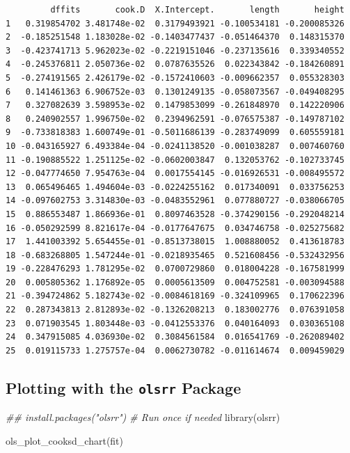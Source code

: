 \documentclass[
  letterpaper,
]{scrbook}
\newenvironment{Shaded}{\begin{snugshade}}{\end{snugshade}}
\newcommand{\DocumentationTok}[1]{\textcolor[rgb]{0.37,0.37,0.37}{\textit{#1}}}
\newcommand{\FunctionTok}[1]{\textcolor[rgb]{0.28,0.35,0.67}{#1}}
\newcommand{\NormalTok}[1]{\textcolor[rgb]{0.00,0.23,0.31}{#1}}
\begin{document}
\begin{verbatim}
         dffits       cook.D  X.Intercept.       length       height
1   0.319854702 3.481748e-02  0.3179493921 -0.100534181 -0.200085326
2  -0.185251548 1.183028e-02 -0.1403477437 -0.051464370  0.148315370
3  -0.423741713 5.962023e-02 -0.2219151046 -0.237135616  0.339340552
4  -0.245376811 2.050736e-02  0.0787635526  0.022343842 -0.184260891
5  -0.274191565 2.426179e-02 -0.1572410603 -0.009662357  0.055328303
6   0.141461363 6.906752e-03  0.1301249135 -0.058073567 -0.049408295
7   0.327082639 3.598953e-02  0.1479853099 -0.261848970  0.142220906
8   0.240902557 1.996750e-02  0.2394962591 -0.076575387 -0.149787102
9  -0.733818383 1.600749e-01 -0.5011686139 -0.283749099  0.605559181
10 -0.043165927 6.493384e-04 -0.0241138520 -0.001038287  0.007460760
11 -0.190885522 1.251125e-02 -0.0602003847  0.132053762 -0.102733745
12 -0.047774650 7.954763e-04  0.0017554145 -0.016926531 -0.008495572
13  0.065496465 1.494604e-03 -0.0224255162  0.017340091  0.033756253
14 -0.097602753 3.314830e-03 -0.0483552961  0.077880727 -0.038066705
15  0.886553487 1.866936e-01  0.8097463528 -0.374290156 -0.292048214
16 -0.050292599 8.821617e-04 -0.0177647675  0.034746758 -0.025275682
17  1.441003392 5.654455e-01 -0.8513738015  1.008880052  0.413618783
18 -0.683268805 1.547244e-01 -0.0218935465  0.521608456 -0.532432956
19 -0.228476293 1.781295e-02  0.0700729860  0.018004228 -0.167581999
20  0.005805362 1.176892e-05  0.0005613509  0.004752581 -0.003094588
21 -0.394724862 5.182743e-02 -0.0084618169 -0.324109965  0.170622396
22  0.287343813 2.812893e-02 -0.1326208213  0.183002776  0.076391058
23  0.071903545 1.803448e-03 -0.0412553376  0.040164093  0.030365108
24  0.347915085 4.036930e-02  0.3084561584  0.016541769 -0.262089402
25  0.019115733 1.275757e-04  0.0062730782 -0.011614674  0.009459029
\end{verbatim}

\subsection{\texorpdfstring{Plotting with the \texttt{olsrr}
Package}{Plotting with the olsrr Package}}\label{plotting-with-the-olsrr-package}

\begin{Shaded}
\begin{Highlighting}[]
\DocumentationTok{\#\# install.packages("olsrr") \# Run once if needed}
\FunctionTok{library}\NormalTok{(olsrr)}

\FunctionTok{ols\_plot\_cooksd\_chart}\NormalTok{(fit)}
\end{Highlighting}
\end{Shaded}
\end{document}
